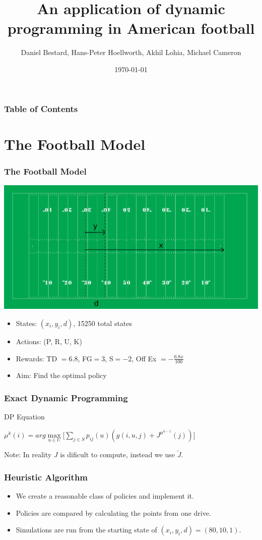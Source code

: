 \documentclass{beamer}
\title[DP in Football]{An application of dynamic programming in American football}
\author[]{Daniel Bestard, Hans-Peter Hoellworth, Akhil Lohia, Michael Cameron}
\institute[BGSE]{Barcelona Graduate School of Economics}
\date{\today}
\begin{document}
\frame{\titlepage}

\begin{frame}
\frametitle{Table of Contents}
\tableofcontents
\end{frame}

\section{The Football Model}
\begin{frame}
\frametitle{The Football Model}

\begin{center}
\includegraphics[scale=0.2]{field}
\end{center}

\begin{itemize}
\item States: $(x_{i}, y_{i}, d)$, 15250 total states 
\item Actions: (P, R, U, K)
\item Rewards: TD $=6.8$, FG$=3$, S$=-2$, Off Ex $= - \frac{6.8 x}{100}$  
\item Aim: Find the optimal policy
\end{itemize}
\end{frame}


\begin{frame}
\frametitle{Exact Dynamic Programming }
\begin{block}{DP Equation}
\begin{center}
$\mu^{k}(i) = arg\max\limits_{u \in U} \Big[ \sum\limits_{j \in S} p_{ij}(u)(g(i,u,j) +  J^{\mu^{k-1}}(j))\Big]$
\end{center}
\end{block}
Note: In reality $J$ is dificult to compute, instead we use $\widetilde{J}$.
\end{frame}

\begin{frame}
\frametitle{Heuristic Algorithm}
\begin{itemize}
\item We create a reasonable class of policies and implement it. 

\item Policies are compared by calculating the points from one drive.

\item Simulations are run from the starting state of $(x_{i},y_{i},d) = (80, 10, 1)$.
\end{itemize} 
\end{frame}
\end{document}
